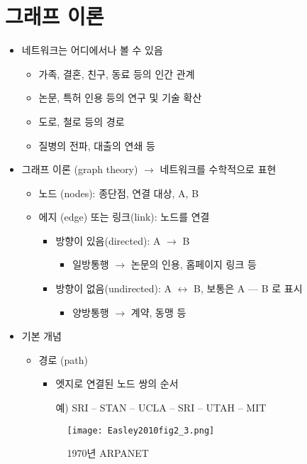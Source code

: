 \section{그래프 이론}\label{sec:}
\begin{itemize}
\item 네트워크는 어디에서나 볼 수 있음 \citep{Jackson:2021aa}
	\begin{itemize}
	\item 가족, 결혼, 친구, 동료 등의 인간 관계
	\item 논문, 특허 인용 등의 연구 및 기술 확산
	\item 도로, 철로 등의 경로
	\item 질병의 전파, 대출의 연쇄 등
	\end{itemize}
\item 그래프 이론 (graph theory) $\rightarrow$ 네트워크를 수학적으로 표현
	\begin{itemize}
	\item 노드 (nodes): 종단점, 연결 대상, A, B 
	\item 에지 (edge) 또는 링크(link): 노드를 연결
		\begin{itemize}
		\item 방향이 있음(directed): A $\rightarrow$ B
			\begin{itemize}
			\item 일방통행 $\rightarrow$ 논문의 인용, 홈페이지 링크 등
			\end{itemize}
		\item 방향이 없음(undirected): A $\leftrightarrow$ B, 보통은 A --- B 로 표시
			\begin{itemize}
			\item 양방통행 $\rightarrow$ 계약, 동맹 등
			\end{itemize}
		\end{itemize}
	\end{itemize}
\item 기본 개념 \cite[Ch. 1]{Easley:2010aa}
	\begin{itemize}
	\item 경로 (path)
		\begin{itemize}
		\item 엣지로 연결된 노드 쌍의 순서
		\item[예)] SRI -- STAN -- UCLA -- SRI -- UTAH -- MIT 
		\end{itemize}
			\begin{figure}[htbp]
			\begin{center}
			\texttt{[image: Easley2010fig2\_3.png]}
			\caption{1970년 ARPANET}

\end{center}
\end{figure}
\end{itemize}
\end{itemize}

